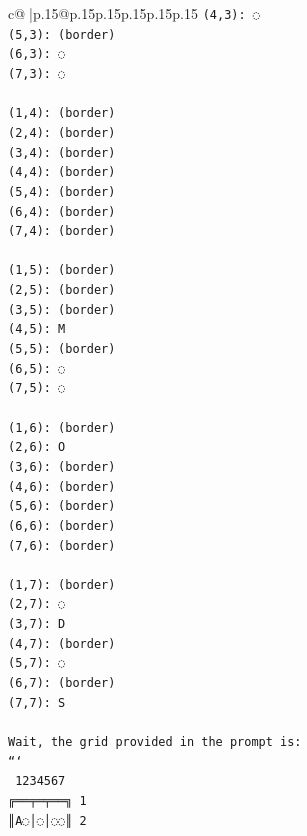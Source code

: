 \documentclass{article}
\begin{document}
{\begin{supertabular}{c@{$\;$}|p{.15\linewidth}@{}p{.15\linewidth}p{.15\linewidth}p{.15\linewidth}p{.15\linewidth}p{.15\linewidth}}
{{{\texttt{(4,3): ◌} \\
\texttt{(5,3): (border)} \\
\texttt{(6,3): ◌} \\
\texttt{(7,3): ◌} \\
\\ 
\texttt{(1,4): (border)} \\
\texttt{(2,4): (border)} \\
\texttt{(3,4): (border)} \\
\texttt{(4,4): (border)} \\
\texttt{(5,4): (border)} \\
\texttt{(6,4): (border)} \\
\texttt{(7,4): (border)} \\
\\ 
\texttt{(1,5): (border)} \\
\texttt{(2,5): (border)} \\
\texttt{(3,5): (border)} \\
\texttt{(4,5): M} \\
\texttt{(5,5): (border)} \\
\texttt{(6,5): ◌} \\
\texttt{(7,5): ◌} \\
\\ 
\texttt{(1,6): (border)} \\
\texttt{(2,6): O} \\
\texttt{(3,6): (border)} \\
\texttt{(4,6): (border)} \\
\texttt{(5,6): (border)} \\
\texttt{(6,6): (border)} \\
\texttt{(7,6): (border)} \\
\\ 
\texttt{(1,7): (border)} \\
\texttt{(2,7): ◌} \\
\texttt{(3,7): D} \\
\texttt{(4,7): (border)} \\
\texttt{(5,7): ◌} \\
\texttt{(6,7): (border)} \\
\texttt{(7,7): S} \\
\\ 
\texttt{Wait, the grid provided in the prompt is:} \\
\texttt{```} \\
\texttt{ 1234567} \\
\texttt{╔══╤═╤══╗ 1} \\
\texttt{║A◌│◌│◌◌║ 2} \\
}}}
\end{supertabular}}
\end{document}
